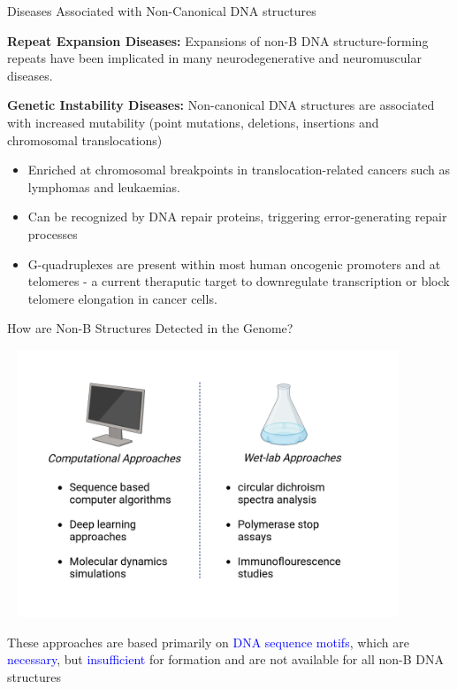 \documentclass{beamer}
\begin{document}
	\begin{frame}{Diseases Associated with Non-Canonical DNA structures}
		
	\textbf{\color{blue}Repeat Expansion Diseases:} Expansions of non-B DNA structure-forming repeats have been implicated in many neurodegenerative and neuromuscular diseases. \newline
	
	\textbf{\color{blue}Genetic Instability Diseases:} Non-canonical DNA structures are associated with increased mutability (point mutations, deletions, insertions and chromosomal translocations)
	
	\begin{itemize}
		\item Enriched at chromosomal breakpoints in translocation-related cancers such as lymphomas and leukaemias.
		\item Can be recognized by DNA repair proteins, triggering error-generating repair processes
		\item G-quadruplexes are present within most human oncogenic promoters and at telomeres - a current theraputic target to downregulate transcription or block telomere elongation in cancer cells.
	\end{itemize}
	
	
	\end{frame}

	\begin{frame}{How are Non-B Structures Detected in the Genome?}
			\begin{center}
				\vspace{-1cm}
				\includegraphics[width=12cm, height=8cm]{Predicting_nonb_structures.png}
				\vspace{-1.5cm}
			\end{center}
		These approaches are based primarily on \textcolor{blue}{DNA sequence motifs}, which are \textcolor{blue}{necessary}, but \textcolor{blue}{insufficient} for formation and are not available for all non-B DNA structures
		
		
	\end{frame}
\end{document}

